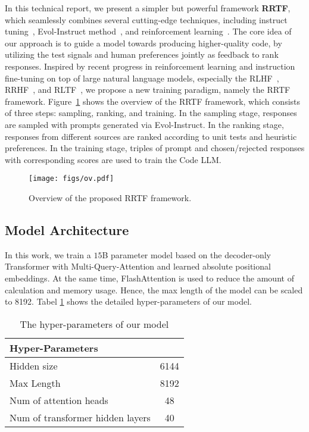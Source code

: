 \documentclass{article}
\begin{document}
In this technical report, we present a simpler but powerful framework \textbf{RRTF}, which seamlessly combines several cutting-edge techniques, including instruct tuning~\cite{instruction-2}, Evol-Instruct method~\cite{wizardlm,wizardcoder}, and reinforcement learning~\cite{rrhf}.
The core idea of our approach is to guide a model towards producing higher-quality code, by utilizing the test signals and human preferences jointly as feedback to rank responses.
Inspired by recent progress in reinforcement learning and instruction fine-tuning on top of large natural language models, especially the RLHF~\cite{instructgpt}, RRHF~\cite{rrhf}, and RLTF~\cite{rltf}, we propose a new training paradigm, namely the RRTF framework.
Figure~\ref{fig.ov} shows the overview of the RRTF framework, which consists of three steps: sampling, ranking, and training. In the sampling stage, responses are sampled with prompts generated via Evol-Instruct. In the ranking stage, responses from different sources are ranked according to unit tests and heuristic preferences. In the training stage, triples of prompt and chosen/rejected responses with corresponding scores are used to train the Code LLM.

\begin{figure}[btp]
	\centering
        \texttt{[image: figs/ov.pdf]}
	\caption{Overview of the proposed RRTF framework.}
	\label{fig.ov} 
\end{figure}

\subsection{Model Architecture}

In this work, we train a $15$B parameter model based on the decoder-only Transformer with Multi-Query-Attention\citet{DBLP:journals/corr/abs-1911-02150} and learned absolute positional embeddings.
At the same time, FlashAttention is used to reduce the amount of calculation and memory usage.
Hence, the max length of the model can be scaled to 8192.
Tabel \ref{tab.model_architecture} shows the detailed hyper-parameters of our model.


\begin{table}[h]
	\caption{The hyper-parameters of our model}
	\centering
	\begin{tabular}{lc}
		\toprule
		Hyper-Parameters  & \makecell{Value} \\
		\midrule
            Hidden size &  6144  \\
            Max Length 	& 8192 \\
            Num of attention heads 	& 48 \\
            Num of transformer hidden layers 	&  40  \\
		\bottomrule
	\end{tabular}
	\label{tab.model_architecture}
\end{table}
\end{document}
